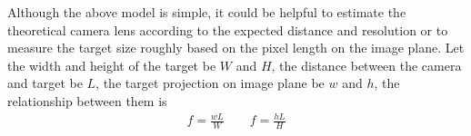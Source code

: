 %

Although the above model is simple, it could be helpful to estimate the theoretical camera lens according to the expected distance and resolution or to measure the target size roughly based on the pixel length on the image plane. Let the width and height of the target be $W$ and $H$, the distance between the camera and target be $L$, the target projection on image plane be $w$ and $h$, the relationship between them is  
\begin{align}
	f=\frac{wL}{W} \qquad f=\frac{hL}{H}
\end{align}

